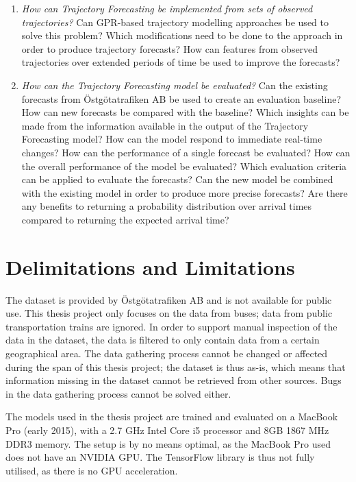 \begin{description}
\begin{enumerate}
    \item \textit{How can Trajectory Forecasting be implemented from sets of observed trajectories?} \newline
    Can GPR-based trajectory modelling approaches be used to solve this problem?
    Which modifications need to be done to the approach in order to produce trajectory forecasts?
    How can features from observed trajectories over extended periods of time be used to improve the forecasts?

    \item \textit{How can the Trajectory Forecasting model be evaluated?} \newline
    Can the existing forecasts from Östgötatrafiken AB be used to create an evaluation baseline?
    How can new forecasts be compared with the baseline?
    Which insights can be made from the information available in the output of the Trajectory Forecasting model?
    How can the model respond to immediate real-time changes?
    How can the performance of a single forecast be evaluated?
    How can the overall performance of the model be evaluated?
    Which evaluation criteria can be applied to evaluate the forecasts?
    Can the new model be combined with the existing model in order to produce more precise forecasts?
    Are there any benefits to returning a probability distribution over arrival times compared to returning the expected arrival time?
  \end{enumerate}
\end{description}

\section{Delimitations and Limitations}
\label{sec:delimitations}
The dataset is provided by Östgötatrafiken AB and is not available for public use.
This thesis project only focuses on the data from buses; data from public transportation trains are ignored.
In order to support manual inspection of the data in the dataset, the data is filtered to only contain data from a certain geographical area.
The data gathering process cannot be changed or affected during the span of this thesis project; the dataset is thus as-is, which means that information missing in the dataset cannot be retrieved from other sources.
Bugs in the data gathering process cannot be solved either.

The models used in the thesis project are trained and evaluated on a MacBook Pro (early 2015), with a 2.7 GHz Intel Core i5 processor and 8GB 1867 MHz DDR3 memory.
The setup is by no means optimal, as the MacBook Pro used does not have an NVIDIA GPU.
The TensorFlow library is thus not fully utilised, as there is no GPU acceleration.

